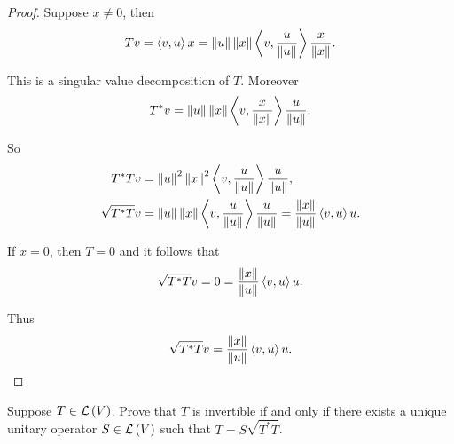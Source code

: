 \begin{proof}
    Suppose $x\ne 0$, then
    \[
        Tv = \left\langle{v, u}\right\rangle x = \left\Vert{u}\right\Vert\left\Vert{x}\right\Vert\left\langle{v,\frac{u}{\left\Vert{u}\right\Vert}}\right\rangle\frac{x}{\left\Vert{x}\right\Vert}.
    \]

    This is a singular value decomposition of $T$. Moreover
    \[
        T^{*}v = \left\Vert{u}\right\Vert\left\Vert{x}\right\Vert\left\langle{v, \frac{x}{\left\Vert{x}\right\Vert}}\right\rangle\frac{u}{\left\Vert{u}\right\Vert}.
    \]

    So
    \begin{align*}
        T^{*}Tv        & = \left\Vert{u}\right\Vert^{2}\left\Vert{x}\right\Vert^{2}\left\langle{v, \frac{u}{\left\Vert{u}\right\Vert}}\right\rangle\frac{u}{\left\Vert{u}\right\Vert},                                      \\
        \sqrt{T^{*}T}v & = \left\Vert{u}\right\Vert\left\Vert{x}\right\Vert\left\langle{v, \frac{u}{\left\Vert{u}\right\Vert}}\right\rangle\frac{u}{\left\Vert{u}\right\Vert} = \frac{\left\Vert{x}\right\Vert}{\left\Vert{u}\right\Vert}\left\langle{v, u}\right\rangle u.
    \end{align*}

    If $x = 0$, then $T = 0$ and it follows that
    \[
        \sqrt{T^{*}T}v = 0 = \frac{\left\Vert{x}\right\Vert}{\left\Vert{u}\right\Vert}\left\langle{v, u}\right\rangle u.
    \]

    Thus
    \[
        \sqrt{T^{*}T}v = \frac{\left\Vert{x}\right\Vert}{\left\Vert{u}\right\Vert}\left\langle{v, u}\right\rangle u.
    \]
\end{proof}
\newpage

\begin{exercise}
    Suppose $T \in \mathcal{L}\left({V}\right)$. Prove that $T$ is invertible if and only if there exists a unique unitary operator $S\in \mathcal{L}\left({V}\right)$ such that $T = S\sqrt{T^{*}T}$.
\end{exercise}

